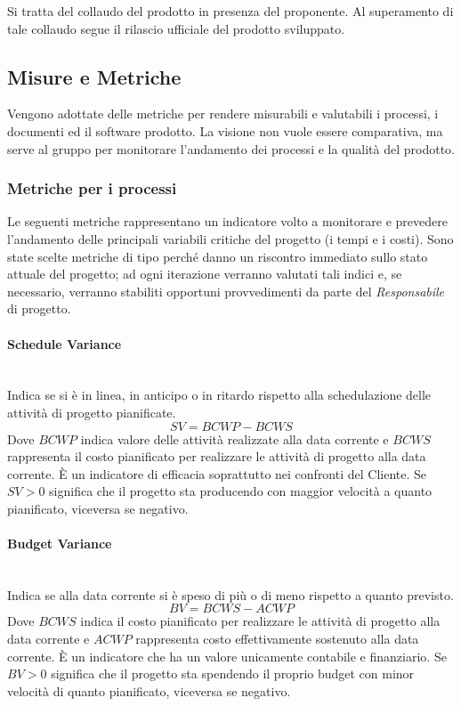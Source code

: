			Si tratta del collaudo del prodotto in presenza del proponente. Al superamento di tale collaudo segue il rilascio ufficiale del prodotto sviluppato.
			
	
	\subsection{Misure e Metriche}
	\label{MisureMetriche}
	
	Vengono adottate delle metriche per rendere misurabili e valutabili i processi, i documenti ed il software prodotto. La visione non vuole essere comparativa, ma serve al gruppo per monitorare l'andamento dei processi e la qualità del prodotto.
		
		\subsubsection{Metriche per i processi}
		Le seguenti metriche rappresentano un indicatore volto a monitorare e prevedere l'andamento delle principali variabili critiche del progetto (i tempi e i costi). Sono state scelte metriche di tipo  perché danno un riscontro immediato sullo stato attuale del progetto; ad ogni iterazione verranno valutati tali indici e, se necessario, verranno stabiliti opportuni provvedimenti da parte del \emph{Responsabile} di progetto.
		
			\paragraph{Schedule Variance} \mbox{} \\

			Indica se si è in linea, in anticipo o in ritardo rispetto alla schedulazione delle attività di progetto pianificate.
			\[
			SV = BCWP - BCWS
			\]
			Dove $BCWP$ indica valore delle attività realizzate alla data corrente e $BCWS$ rappresenta il costo pianificato per realizzare le attività di progetto alla data corrente. 
			È un indicatore di efficacia soprattutto nei confronti del Cliente. Se $SV>0$ significa che il progetto sta producendo con maggior velocità a quanto pianificato, viceversa se negativo.
			
			\paragraph{Budget Variance}\mbox{} \\
			
			Indica se alla data corrente si è speso di più o di meno rispetto a quanto previsto.
			\[
			BV = BCWS - ACWP
			\]
			Dove $BCWS$ indica il costo pianificato per realizzare le attività di  progetto alla  data corrente e $ACWP$ rappresenta costo effettivamente sostenuto alla data  corrente.
			È un indicatore che ha un valore unicamente contabile e finanziario. Se $BV>0$ significa che il progetto sta spendendo il proprio budget con minor velocità di quanto pianificato, viceversa se negativo. 
			
